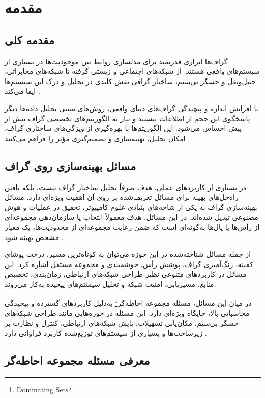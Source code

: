 \chapter{مقدمه}
\label{ch:intro}

\section{مقدمه کلی}

گراف‌ها ابزاری قدرتمند برای مدلسازی روابط بین موجودیت‌ها در بسیاری از سیستم‌های واقعی هستند. از شبکه‌های اجتماعی و زیستی گرفته تا شبکه‌های مخابراتی، حمل‌ونقل و حسگر بی‌سیم، ساختار گرافی نقش کلیدی در تحلیل و درک این سیستم‌ها ایفا می‌کند \cite{alanko2010}.

با افزایش اندازه و پیچیدگی گراف‌های دنیای واقعی، روش‌های سنتی تحلیل داده‌ها دیگر پاسخگوی این حجم از اطلاعات نیستند و نیاز به الگوریتم‌های تخصصی گراف بیش از پیش احساس می‌شود. این الگوریتم‌ها با بهره‌گیری از ویژگی‌های ساختاری گراف، امکان تحلیل، بهینه‌سازی و تصمیم‌گیری مؤثر را فراهم می‌کنند \cite{bengio2021, bondy2008}.

\section{مسائل بهینه‌سازی روی گراف}

در بسیاری از کاربردهای عملی، هدف صرفاً تحلیل ساختار گراف نیست، بلکه یافتن راه‌حل‌های بهینه برای مسائل تعریف‌شده بر روی آن اهمیت ویژه‌ای دارد. مسائل بهینه‌سازی گراف به یکی از شاخه‌های بنیادی علوم کامپیوتر، تحقیق در عملیات و هوش مصنوعی تبدیل شده‌اند. در این مسائل، هدف معمولاً انتخاب یا سازمان‌دهی مجموعه‌ای از رأس‌ها یا یال‌ها به‌گونه‌ای است که ضمن رعایت مجموعه‌ای از محدودیت‌ها، یک معیار مشخص بهینه شود \cite{paschos2010}.

از جمله مسائل شناخته‌شده در این حوزه می‌توان به کوتاه‌ترین مسیر، درخت پوشای کمینه، رنگ‌آمیزی گراف، پوشش رأس، خوشه‌بندی و مجموعه مستقل اشاره کرد. این مسائل در کاربردهای متنوعی نظیر طراحی شبکه‌های ارتباطی، زمان‌بندی، تخصیص منابع، مسیریابی، امنیت شبکه و تحلیل سیستم‌های پیچیده به‌کار می‌روند.

در میان این مسائل، مسئله مجموعه احاطه‌گر\footnote{Dominating Set} به‌دلیل کاربردهای گسترده و پیچیدگی محاسباتی بالا، جایگاه ویژه‌ای دارد. این مسئله در حوزه‌هایی مانند طراحی شبکه‌های حسگر بی‌سیم، مکان‌یابی تسهیلات، پایش شبکه‌های ارتباطی، کنترل و نظارت بر زیرساخت‌ها و بسیاری از سیستم‌های توزیع‌شده کاربرد فراوانی دارد \cite{haynes1998fundamentals, ore1962theory}.

\section{معرفی مسئله مجموعه احاطه‌گر}

